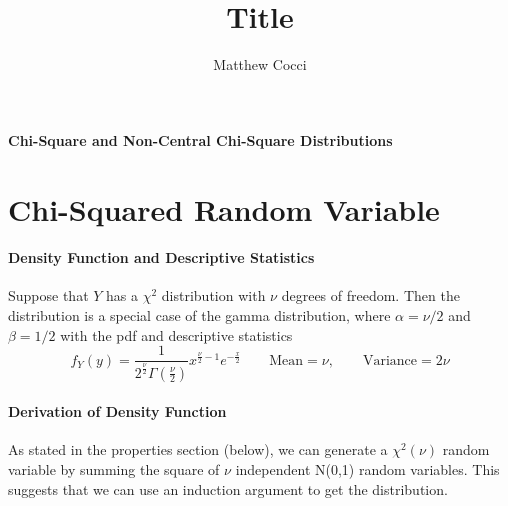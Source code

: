 \documentclass[a4paper,12pt]{scrartcl}
\author{Matthew Cocci}
\title{Title}
\date{}
\begin{document}
\begin{center}
   \LARGE 
   \textbf{Chi-Square and Non-Central Chi-Square Distributions}
\end{center}
\section{Chi-Squared Random Variable}

\paragraph{Density Function and Descriptive Statistics}
Suppose that $Y$ has a $\chi^2$ distribution with $\nu$ degrees
of freedom. Then the distribution is a special case of the gamma 
distribution, where $\alpha = \nu/2$ and $\beta = 1/2$ with the pdf
and descriptive statistics
\begin{equation}
   f_Y(y) = \frac{1}{2^{\frac{\nu}{2}} \Gamma\left(\frac{\nu}{2}\right)}
      x^{\frac{\nu}{2} - 1} e^{-\frac{x}{2}} \qquad 
\text{Mean} = \nu, \qquad \text{Variance} = 2 \nu
\end{equation}

\paragraph{Derivation of Density Function} As stated in the properties
section (below), we can generate a $\chi^2(\nu)$ random variable by
summing the square of $\nu$ independent N(0,1) random variables. This
suggests that we can use an induction argument to get the distribution.

\newpage
\end{document}

